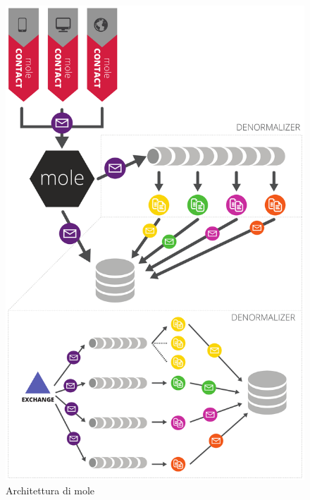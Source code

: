 



\begin{figure}[h]
\centering
\includegraphics[width=1.0\linewidth]{./img/mole}
\caption[Architettura di mole]{Architettura di mole}
\label{fig:mole}
\end{figure}